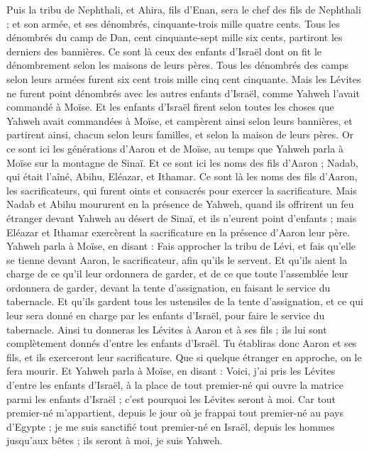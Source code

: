 \begin{multicols}{2}
Puis la tribu de Nephthali, et Ahira, fils d'Enan, sera le chef des fils de Nephthali ;
et son armée, et ses dénombrés, cinquante-trois mille quatre cents.
Tous les dénombrés du camp de Dan, cent cinquante-sept mille six cents, partiront les derniers des bannières.
Ce sont là ceux des enfants d'Israël dont on fit le dénombrement selon les maisons de leurs pères. Tous les dénombrés des camps selon leurs armées furent six cent trois mille cinq cent cinquante.
Mais les Lévites ne furent point dénombrés avec les autres enfants d'Israël, comme Yahweh l'avait commandé à Moïse.
Et les enfants d'Israël firent selon toutes les choses que Yahweh avait commandées à Moïse, et campèrent ainsi selon leurs bannières, et partirent ainsi, chacun selon leurs familles, et selon la maison de leurs pères.
\VerseOne{}Or ce sont ici les générations d'Aaron et de Moïse, au temps que Yahweh parla à Moïse sur la montagne de Sinaï.
Et ce sont ici les noms des fils d'Aaron ; Nadab, qui était l'aîné, Abihu, Eléazar, et Ithamar.
Ce sont là les noms des fils d'Aaron, les sacrificateurs, qui furent oints et consacrés pour exercer la sacrificature.
Mais Nadab et Abihu moururent en la présence de Yahweh, quand ils offrirent un feu étranger devant Yahweh au désert de Sinaï, et ils n'eurent point d'enfants ; mais Eléazar et Ithamar exercèrent la sacrificature en la présence d'Aaron leur père.
Yahweh parla à Moïse, en disant :
Fais approcher la tribu de Lévi, et fais qu'elle se tienne devant Aaron, le sacrificateur, afin qu'ils le servent.
Et qu'ils aient la charge de ce qu'il leur ordonnera de garder, et de ce que toute l'assemblée leur ordonnera de garder, devant la tente d'assignation, en faisant le service du tabernacle.
Et qu'ils gardent tous les ustensiles de la tente d'assignation, et ce qui leur sera donné en charge par les enfants d'Israël, pour faire le service du tabernacle.
Ainsi tu donneras les Lévites à Aaron et à ses fils ; ils lui sont complètement donnés d'entre les enfants d'Israël.
Tu établiras donc Aaron et ses fils, et ils exerceront leur sacrificature. Que si quelque étranger en approche, on le fera mourir.
Et Yahweh parla à Moïse, en disant :
Voici, j'ai pris les Lévites d'entre les enfants d'Israël, à la place de tout premier-né qui ouvre la matrice parmi les enfants d'Israël ; c'est pourquoi les Lévites seront à moi.
Car tout premier-né m'appartient, depuis le jour où je frappai tout premier-né au pays d'Egypte ; je me suis sanctifié tout premier-né en Israël, depuis les hommes jusqu'aux bêtes ; ils seront à moi, je suis Yahweh.

\end{multicols}
